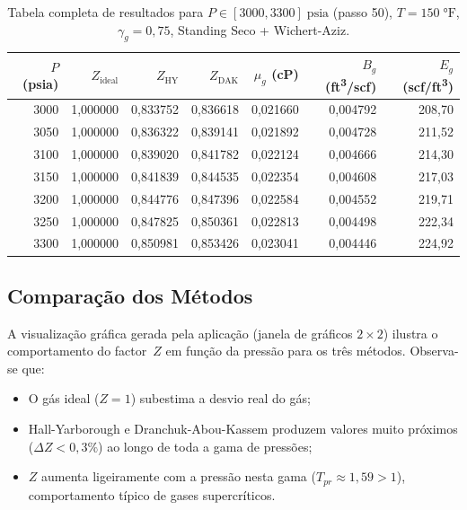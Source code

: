 \documentclass[12pt,a4paper]{article}
\begin{document}
\begin{table}[H]
\centering
\caption{Tabela completa de resultados para $P \in [3000, 3300]\;\text{psia}$
         (passo 50), $T=150\;°\text{F}$, $\gamma_g=0{,}75$, Standing Seco +
         Wichert-Aziz.}
\setlength{\tabcolsep}{6pt}
\begin{tabular}{r r r r r r r}
\toprule
$P$ (psia) & $Z_{\text{ideal}}$ & $Z_{\text{HY}}$ & $Z_{\text{DAK}}$
           & $\mu_g$ (cP) & $B_g$ (ft\textsuperscript{3}/scf) & $E_g$ (scf/ft\textsuperscript{3}) \\
\midrule
3000 & 1{,}000000 & 0{,}833752 & 0{,}836618 & 0{,}021660 & 0{,}004792 & 208{,}70 \\
3050 & 1{,}000000 & 0{,}836322 & 0{,}839141 & 0{,}021892 & 0{,}004728 & 211{,}52 \\
3100 & 1{,}000000 & 0{,}839020 & 0{,}841782 & 0{,}022124 & 0{,}004666 & 214{,}30 \\
3150 & 1{,}000000 & 0{,}841839 & 0{,}844535 & 0{,}022354 & 0{,}004608 & 217{,}03 \\
3200 & 1{,}000000 & 0{,}844776 & 0{,}847396 & 0{,}022584 & 0{,}004552 & 219{,}71 \\
3250 & 1{,}000000 & 0{,}847825 & 0{,}850361 & 0{,}022813 & 0{,}004498 & 222{,}34 \\
3300 & 1{,}000000 & 0{,}850981 & 0{,}853426 & 0{,}023041 & 0{,}004446 & 224{,}92 \\
\bottomrule
\end{tabular}
\label{tab:resultados}
\end{table}

\subsection{Comparação dos Métodos}

A visualização gráfica gerada pela aplicação (janela de gráficos $2\times2$) ilustra o comportamento do factor~$Z$
em função da pressão para os três métodos. Observa-se que:

\begin{itemize}[noitemsep]
  \item O gás ideal ($Z=1$) subestima a desvio real do gás;
  \item Hall-Yarborough e Dranchuk-Abou-Kassem produzem valores muito próximos
    ($\Delta Z < 0{,}3\%$) ao longo de toda a gama de pressões;
  \item $Z$ aumenta ligeiramente com a pressão nesta gama
    ($T_{pr}\approx 1{,}59 > 1$), comportamento típico de gases supercríticos.
\end{itemize}
\end{document}
